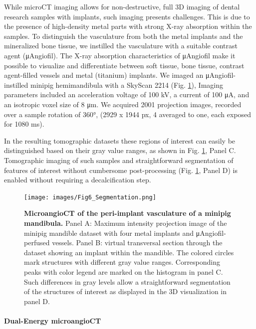 While microCT imaging allows for non-destructive, full 3D imaging of dental research samples with implants, such imaging presents challenges.
This is due to the presence of high-density metal parts with strong X-ray absorption within the samples.
To distinguish the vasculature from both the metal implants and the mineralized bone tissue, we instilled the vasculature with a suitable contrast agent (μAngiofil).
The X-ray absorption characteristics of μAngiofil make it possible to visualize and differentiate between soft tissue, bone tissue, contrast agent-filled vessels and metal (titanium) implants.
We imaged an μAngiofil-instilled minipig hemimandibula with a SkyScan 2214 (Fig. \ref{fig:6}),
Imaging parameters included an acceleration voltage of 100 kV, a current of 100 μA, and an isotropic voxel size of 8 μm.
We acquired 2001 projection images, recorded over a sample rotation of 360°, (2929 x 1944 px, 4 averaged to one, each exposed for 1080 ms).

In the resulting tomographic datasets these regions of interest can easily be distinguished based on their gray value ranges, as shown in Fig. \ref{fig:6}, Panel C.
Tomographic imaging of such samples and straightforward segmentation of features of interest without cumbersome post-processing (Fig. \ref{fig:6}, Panel D) is enabled without requiring a decalcification step.

\begin{figure}
\hypertarget{fig:6}{%
\centering
\texttt{[image: images/Fig6\_Segmentation.png]}
\caption{\textbf{MicroangioCT of the peri-implant vasculature of a minipig mandibula.}
Panel A: Maximum intensity projection image of the minipig mandible dataset with four metal implants and μAngiofil-perfused vessels.
Panel B: virtual transversal section through the dataset showing an implant within the mandible.
The colored circles mark structures with different gray value ranges.
Corresponding peaks with color legend are marked on the histogram in panel C.
Such differences in gray levels allow a straightforward segmentation of the structures of interest as displayed in the 3D visualization in panel D.}\label{fig:6}
}
\end{figure}

\hypertarget{dual-energy-microangioct}{%
\paragraph{Dual-Energy microangioCT}\label{dual-energy-microangioct}}

